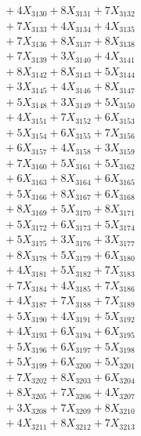 \documentclass[a4paper,10pt]{article}
\begin{document}
{\begin{align}
&\;  + 4 X_{3130} + 8 X_{3131} + 7 X_{3132} \\[0.3ex]
&\;  + 7 X_{3133} + 4 X_{3134} + 4 X_{3135} \\[0.3ex]
&\;  + 7 X_{3136} + 8 X_{3137} + 8 X_{3138} \\[0.3ex]
&\;  + 7 X_{3139} + 3 X_{3140} + 4 X_{3141} \\[0.3ex]
&\;  + 8 X_{3142} + 8 X_{3143} + 5 X_{3144} \\[0.3ex]
&\;  + 3 X_{3145} + 4 X_{3146} + 8 X_{3147} \\[0.3ex]
&\;  + 5 X_{3148} + 3 X_{3149} + 5 X_{3150} \\[0.3ex]
&\;  + 4 X_{3151} + 7 X_{3152} + 6 X_{3153} \\[0.3ex]
&\;  + 5 X_{3154} + 6 X_{3155} + 7 X_{3156} \\[0.3ex]
&\;  + 6 X_{3157} + 4 X_{3158} + 3 X_{3159} \\[0.5ex]\allowbreak
&\;  + 7 X_{3160} + 5 X_{3161} + 5 X_{3162} \\[0.3ex]
&\;  + 6 X_{3163} + 8 X_{3164} + 6 X_{3165} \\[0.3ex]
&\;  + 5 X_{3166} + 8 X_{3167} + 6 X_{3168} \\[0.3ex]
&\;  + 8 X_{3169} + 5 X_{3170} + 8 X_{3171} \\[0.3ex]
&\;  + 5 X_{3172} + 6 X_{3173} + 5 X_{3174} \\[0.3ex]
&\;  + 5 X_{3175} + 3 X_{3176} + 3 X_{3177} \\[0.3ex]
&\;  + 8 X_{3178} + 5 X_{3179} + 6 X_{3180} \\[0.3ex]
&\;  + 4 X_{3181} + 5 X_{3182} + 7 X_{3183} \\[0.3ex]
&\;  + 7 X_{3184} + 4 X_{3185} + 7 X_{3186} \\[0.3ex]
&\;  + 4 X_{3187} + 7 X_{3188} + 7 X_{3189} \\[0.5ex]\allowbreak
&\;  + 5 X_{3190} + 4 X_{3191} + 5 X_{3192} \\[0.3ex]
&\;  + 4 X_{3193} + 6 X_{3194} + 6 X_{3195} \\[0.3ex]
&\;  + 5 X_{3196} + 6 X_{3197} + 5 X_{3198} \\[0.3ex]
&\;  + 5 X_{3199} + 6 X_{3200} + 5 X_{3201} \\[0.3ex]
&\;  + 7 X_{3202} + 8 X_{3203} + 6 X_{3204} \\[0.3ex]
&\;  + 8 X_{3205} + 7 X_{3206} + 4 X_{3207} \\[0.3ex]
&\;  + 3 X_{3208} + 7 X_{3209} + 8 X_{3210} \\[0.3ex]
&\;  + 4 X_{3211} + 8 X_{3212} + 7 X_{3213} \\[0.3ex]

\end{align}}
\end{document}
